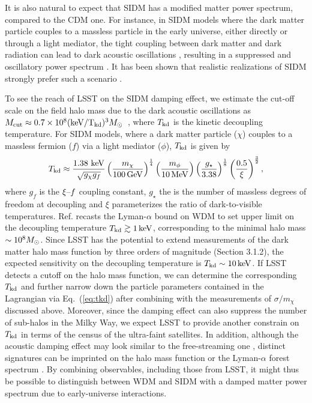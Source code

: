 
It is also natural to expect that SIDM has a modified matter power spectrum, compared to the CDM one. For instance, in SIDM models where the dark matter particle couples to a massless particle in the early universe, either directly or through a light mediator, the tight coupling between dark matter and dark radiation can lead to dark acoustic oscillations \citep{Cyr-Racine:2013ab,Cyr-Racine:2013fsa}, resulting in a suppressed and oscillatory power spectrum \citep[\eg][]{1992ApJ...398...43C,Boehm:2001hm,Boehm:2004th,Feng:2009mn,Aarssen:2012fx}. It has been shown that realistic realizations of SIDM strongly prefer such a scenario \citep{ Huo:2017vef}.

To see the reach of LSST on the SIDM damping effect, we estimate the cut-off scale on the field halo mass due to the dark acoustic oscillations as $M_{\rm cut}\approx0.7\times10^{8}({\rm keV/T_{\rm kd}})^3M_\odot$~\citep{1512.05349}, where $T_{\rm kd}$ is the kinetic decoupling temperature. For SIDM models, where a dark matter particle ($\chi$) couples to a massless fermion ($f$) via a light mediator ($\phi$), $T_{\rm kd}$ is given by~\citep{Aarssen:2012fx,Cyr-Racine:2015ihg}
\begin{equation}
T_{\rm kd}\approx\frac{1.38~{\rm keV}}{\sqrt{g_\chi g_f}}\left(\frac{m_\chi}{100 \mathrm{\,GeV}}\right)^{\frac{1}{4}}\left(\frac{m_\phi}{10 \mathrm{\,MeV}}\right)\left(\frac{g_\star}{3.38}\right)^{\frac{1}{8}}\left(\frac{0.5}{\xi}\right)^{\frac{3}{2}},
\label{eq:tkd}
\end{equation}
where $g_f$ is the $\xi\textup{--}f$ coupling constant, $g_\star$ the is the number of massless degrees of freedom at decoupling and $\xi$ parameterizes the ratio of dark-to-visible temperatures. Ref. \cite{Huo:2017vef} recasts the Lyman-$\alpha$ bound on WDM to set upper limit on the decoupling temperature $T_{\rm kd}\gtrsim 1 \mathrm{\,keV}$, corresponding to the minimal halo mass $\sim10^8 M_\odot$. Since LSST has the potential to extend measurements of the dark matter halo mass function by three orders of magnitude (Section 3.1.2), the expected sensitivity on the decoupling temperature is $T_{\rm kd}\sim 10 \mathrm{\,keV}$. If LSST detects a cutoff on the halo mass function, we can determine the corresponding $T_{\rm kd}$ and further narrow down the particle parameters contained in the Lagrangian via Eq.~(\ref{eq:tkd}) after combining with the measurements of $\sigma/m_\chi$ discussed above. Moreover, since the damping effect can also suppress the number of sub-halos in the Milky Way, we expect LSST to provide another constrain on $T_{\rm kd}$ in terms of the census of the ultra-faint satellites. In addition, although the acoustic damping effect may look similar to the free-streaming one \citep[\eg][]{1512.05349}, distinct signatures can be imprinted on the halo mass function \citep{Buckley:2014ab,Sameie:2018juk} or the Lyman-$\alpha$ forest spectrum \citep{Krall:2017xcw,Bose:2018juc}. By combining observables, including those from LSST, it might thus be possible to distinguish between WDM and SIDM with a damped matter power spectrum due to early-universe interactions.

